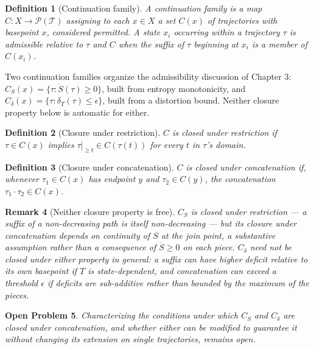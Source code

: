 \documentclass[12pt]{report}
\newtheorem{definition}{Definition}[section]
\newtheorem{openproblem}[definition]{Open Problem}
\newtheorem{remark}[definition]{Remark}
\begin{document}
\begin{definition}[Continuation family]
\label{def:continuation-family-formal}
A continuation family is a map $C : X \to \mathcal{P}(\mathcal{T})$
assigning to each $x \in X$ a set $C(x)$ of trajectories with basepoint
$x$, considered permitted. A state $x_i$ occurring within a trajectory
$\tau$ is admissible relative to $\tau$ and $C$ when the suffix of
$\tau$ beginning at $x_i$ is a member of $C(x_i)$.
\end{definition}

Two continuation families organize the admissibility discussion of
Chapter 3: $C_S(x) = \{\tau : \dot{S}(\tau) \geq 0\}$, built from entropy
monotonicity, and $C_\delta(x) = \{\tau : \delta_T(\tau) \leq
\epsilon\}$, built from a distortion bound. Neither closure property
below is automatic for either.

\begin{definition}[Closure under restriction]
$C$ is closed under restriction if $\tau \in C(x)$ implies $\tau|_{\geq
t} \in C(\tau(t))$ for every $t$ in $\tau$'s domain.
\end{definition}

\begin{definition}[Closure under concatenation]
$C$ is closed under concatenation if, whenever $\tau_1 \in C(x)$ has
endpoint $y$ and $\tau_2 \in C(y)$, the concatenation $\tau_1 \cdot
\tau_2 \in C(x)$.
\end{definition}

\begin{remark}[Neither closure property is free]
$C_S$ is closed under restriction --- a suffix of a non-decreasing path
is itself non-decreasing --- but its closure under concatenation depends
on continuity of $S$ at the join point, a substantive assumption rather
than a consequence of $\dot{S} \geq 0$ on each piece. $C_\delta$ need not
be closed under either property in general: a suffix can have higher
deficit relative to its own basepoint if $T$ is state-dependent, and
concatenation can exceed a threshold $\epsilon$ if deficits are
sub-additive rather than bounded by the maximum of the pieces.
\end{remark}

\begin{openproblem}
Characterizing the conditions under which $C_S$ and $C_\delta$ are
closed under concatenation, and whether either can be modified to
guarantee it without changing its extension on single trajectories,
remains open.
\end{openproblem}
\end{document}
